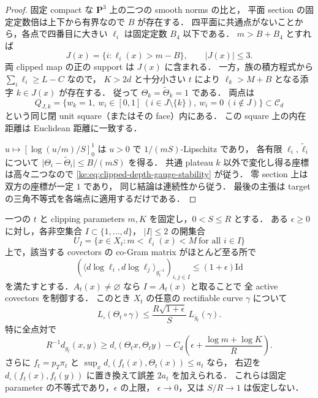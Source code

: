 \begin{proof}
固定 compact な \(\mathbf P^3\) 上の二つの smooth norms の比と，
平面 section の固定定数倍は上下から有界なので \(B\) が存在する．
四平面に共通点がないことから，各点で四番目に大きい
\(\ell_i\) は固定定数 \(B_4\) 以下である．
\(m>B+B_4\) とすれば
\[
 J(x)=\{i:\ell_i(x)>m-B\},\qquad |J(x)|\le3.
\]
両 clipped map の正の support は \(J(x)\) に含まれる．
一方，族の積方程式から
\(\sum_i\ell_i\ge L-C\) なので，
\(K>2d\) と十分小さい \(t\) により
\(\ell_k>M+B\) となる添字 \(k\in J(x)\) が存在する．
従って \(\Theta_k=\widetilde\Theta_k=1\) である．
両点は
\[
 Q_{J,k}=\{w_k=1,\ w_i\in[0,1]\ (i\in J\setminus\{k\}),
                     \ w_i=0\ (i\notin J)\}
 \subset\mathcal C_d
\]
という同じ閉 unit square（またはその face）内にある．
この square 上の内在距離は Euclidean 距離に一致する．

\(u\mapsto[\log(u/m)/S]_0^1\) は \(u>0\) で
\(1/(mS)\)-Lipschitz であり，
各有限 \(\ell_i,\widetilde\ell_i\) について
\(\lvert\Theta_i-\widetilde\Theta_i\rvert\le B/(mS)\) を得る．
共通 plateau \(k\) 以外で変化し得る座標は高々二つなので
\eqref{ke:eq:clipped-depth-gauge-stability} が従う．
零 section 上は双方の座標が一定 \(1\) であり，
同じ結論は連続性から従う．
最後の主張は target の三角不等式を各端点に適用するだけである．
\end{proof}

\begin{lemma}
\label{ke:global-clipped-cogram-lower}
一つの $t$ と clipping parameters $m,K$ を固定し，$0<S\le R$ とする．
ある $\epsilon\ge0$ に対し，各非空集合 $I\subset\{1,\ldots,d\}$，
$|I|\le2$ の開集合
\[
 U_I=\{x\in X_t:m<\ell_i(x)<M\ \text{for all }i\in I\}
\]
上で，該当する covectors の co-Gram matrix がほとんど至る所で
\begin{equation}\label{ke:eq:global-active-upper}
 \left(\langle d\log\ell_i,d\log\ell_j\rangle_{g_t^{-1}}
       \right)_{i,j\in I}\le(1+\epsilon)\mathrm{Id}
\end{equation}
を満たすとする．$A_t(x)\ne\varnothing$ なら $I=A_t(x)$ と取ることで
全 active covectors を制御する．
このとき $X_t$ の任意の rectifiable curve $\gamma$ について
\[
 L_\square(\Theta_t\circ\gamma)
 \le\frac{R\sqrt{1+\epsilon}}S\,L_{\bar g_t}(\gamma).
\]
特に全点対で
\begin{equation}\label{ke:eq:global-raw-lower}
 R^{-1}d_{g_t}(x,y)
 \ge d_\square(\Theta_t x,\Theta_t y)
 -C_d\left(\epsilon+\frac{\log m+\log K}{R}\right).
\end{equation}
さらに $f_t=p_T\pi_t$ と
$\sup_xd_\square(f_t(x),\Theta_t(x))\le a_t$ なら，
右辺を $d_\square(f_t(x),f_t(y))$ に置き換えて誤差 $2a_t$ を加えられる．
これらは固定 parameter の不等式であり，$\epsilon$ の上限，
$\epsilon\to0$，又は $S/R\to1$ は仮定しない．
\end{lemma}

